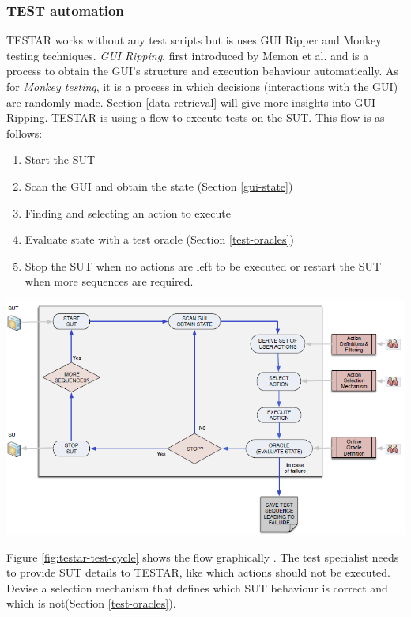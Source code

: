 \subsubsection{TEST automation} \label{testar-testauto}
TESTAR works without any test scripts but is uses GUI Ripper and Monkey testing techniques. \emph{GUI Ripping}, first introduced by Memon et al. \cite{gui-ripping} and is a process to obtain the GUI's structure and execution behaviour automatically. As for \emph{Monkey testing}, it is a process in which decisions (interactions with the GUI) are randomly made. Section \ref{data-retrieval} will give more insights into GUI Ripping.
TESTAR is using a flow to execute tests on the SUT. This flow is as follows:
\begin{enumerate}
    \item Start the SUT
    \item Scan the GUI and obtain the state (Section \ref{gui-state})
    \item Finding and selecting an action to execute
    \item Evaluate state with a test oracle (Section \ref{test-oracles})
    \item Stop the SUT when no actions are left to be executed or restart the SUT when more sequences are required.
\end{enumerate}

\begingroup
\captionsetup{type=figure}
\includegraphics[scale=0.8]{pics/testar-test-cycle.png}
\label{fig:testar-test-cycle}
\endgroup

Figure \ref{fig:testar-test-cycle} shows the flow graphically \cite{VosAho2021}. The test specialist needs to provide SUT details to TESTAR, like which actions should not be executed. Devise a selection mechanism that defines which SUT behaviour is correct and which is not(Section \ref{test-oracles}). 

